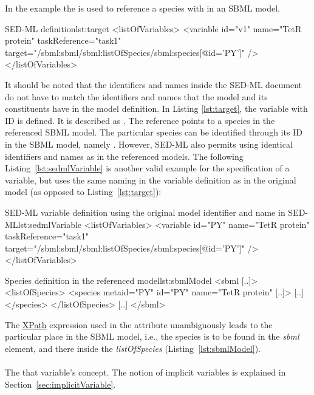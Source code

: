 In the example the  is used to reference a species with  in an SBML model.
\begin{myXmlLst}{SED-ML  definition}{lst:target}
<listOfVariables>
	<variable id="v1" name="TetR protein" taskReference="task1" 
		target="/sbml:sbml/sbml:listOfSpecies/sbml:species[@id='PY']" />
</listOfVariables>
\end{myXmlLst}

It should be noted that the identifiers and names inside the SED-ML document do not have to match the identifiers and names that the model and its constituents have in the model definition. In Listing \ref{lst:target}, the variable with ID  is defined. It is described as . The reference points to a species in the referenced SBML model. The particular species can be identified through its ID in the SBML model, namely . However, SED-ML also permits using identical identifiers and names as in the referenced models. The following Listing~\vref{lst:sedmlVariable} is another valid example for the specification of a variable, but uses the same naming in the variable definition as in the original model (as opposed to Listing~\ref{lst:target}):

\begin{myXmlLst}{SED-ML variable definition using the original model identifier and name in SED-ML}{lst:sedmlVariable}
<listOfVariables>
	<variable id="PY" name="TetR protein"  taskReference="task1" 
		target="/sbml:sbml/sbml:listOfSpecies/sbml:species[@id='PY']" />
</listOfVariables>
\end{myXmlLst}

\begin{myXmlLst}{Species definition in the referenced model}{lst:sbmlModel}
<sbml [..]>
	<listOfSpecies>
		<species metaid="PY" id="PY" name="TetR protein" [..]>
		[..]
		</species>
 	</listOfSpecies>
 	[..]
</sbml>
\end{myXmlLst}

The \hyperref[sec:xpath]{XPath} expression used in the  attribute unambiguously leads to the particular place in the SBML model, i.e., the species is to be found in the \emph{sbml} element, and there inside the \emph{listOfSpecies} (Listing~\ref{lst:sbmlModel}). 



\paragraph*{}
\label{sec:symbol}
The   that variable's concept. The notion of implicit variables is explained in Section~\ref{sec:implicitVariable}.  

